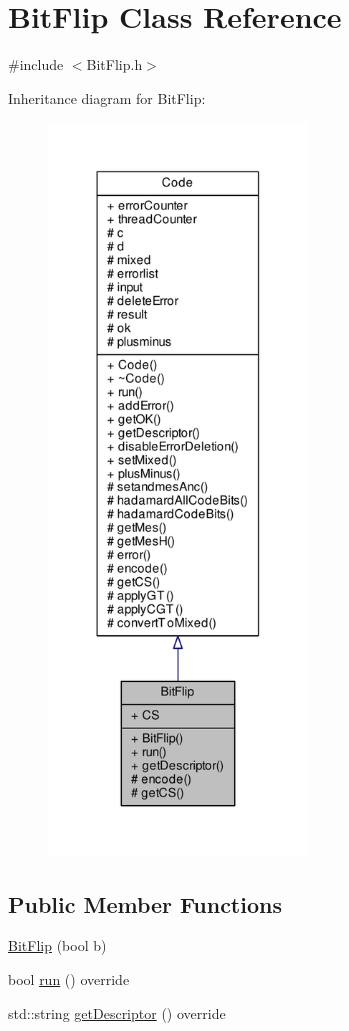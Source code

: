 \hypertarget{class_bit_flip}{}\section{Bit\+Flip Class Reference}
\label{class_bit_flip}


{\ttfamily \#include $<$Bit\+Flip.\+h$>$}



Inheritance diagram for Bit\+Flip\+:
\nopagebreak
\begin{figure}[H]
\begin{center}
\leavevmode
\includegraphics[height=550pt]{class_bit_flip__inherit__graph}
\end{center}
\end{figure}
\subsection*{Public Member Functions}
\begin{DoxyCompactItemize}
\item 
\hyperlink{class_bit_flip_ae5135dd8438d0c1f1d2a9d19ed753e32}{Bit\+Flip} (bool b)
\item 
bool \hyperlink{class_bit_flip_a3022463e79c6624b2123617d1957d716}{run} () override
\item 
std\+::string \hyperlink{class_bit_flip_adc65379e4eeb6eb908318a98c304e16e}{get\+Descriptor} () override
\end{DoxyCompactItemize}
